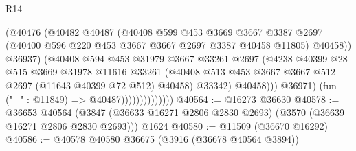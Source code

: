\begin{lexlean}{R14}
\begin{coremodule}
                                    (@40476
                                      (@40482
                                        @40487
                                        (@40408
                                          @599
                                          @453
                                          @3669
                                          @3667
                                          @3387
                                          @2697
                                          (@40400
                                            @596
                                            @220
                                            @453
                                            @3667
                                            @3667
                                            @2697
                                            @3387
                                            @40458
                                            @11805)
                                          @40458))
                                      @36937)
                                    (@40408
                                      @594
                                      @453
                                      @31979
                                      @3667
                                      @33261
                                      @2697
                                      (@4238
                                        @40399
                                        @28
                                        @515
                                        @3669
                                        @31978
                                        @11616
                                        @33261
                                        (@40408
                                          @513
                                          @453
                                          @3667
                                          @3667
                                          @512
                                          @2697
                                          (@11643 @40399 @72 @512)
                                          @40458)
                                        @33342)
                                      @40458)))
                                @36971)
                              (fun ("_" : @11849) => @40487))))))))))))))
@40564 := @16273 @36630
@40578 := @36653
    @40564
    (@3847 (@36633 @16271 @2806 @2830 @2693) (@3570 (@36639 @16271 @2806 @2830 @2693)))
    @1624
@40580 := @11509 (@36670 @16292)
@40586 := @40578 @40580 @36675 (@3916 (@36678 @40564 @3894))

\end{coremodule}
\end{lexlean}
